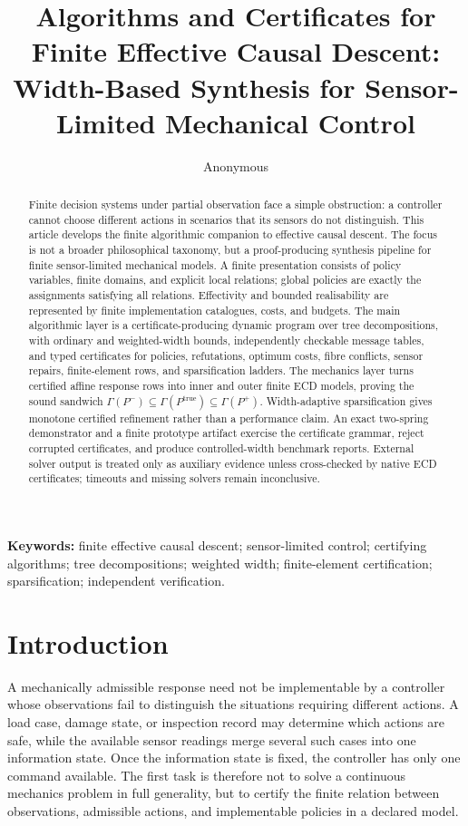 \documentclass[11pt]{article}
\title{Algorithms and Certificates for Finite Effective Causal Descent:\\
Width-Based Synthesis for Sensor-Limited Mechanical Control}
\author{Anonymous}
\date{}
\theoremstyle{plain}
\theoremstyle{definition}
\theoremstyle{remark}
\begin{document}
\maketitle

\begin{abstract}
Finite decision systems under partial observation face a simple obstruction: a
controller cannot choose different actions in scenarios that its sensors do not
distinguish.  This article develops the finite algorithmic companion to
effective causal descent.  The focus is not a broader philosophical taxonomy,
but a proof-producing synthesis pipeline for finite sensor-limited mechanical
models.  A finite presentation consists of policy variables, finite domains, and
explicit local relations; global policies are exactly the assignments satisfying
all relations.  Effectivity and bounded realisability are represented by finite
implementation catalogues, costs, and budgets.  The main algorithmic layer is a
certificate-producing dynamic program over tree decompositions, with ordinary
and weighted-width bounds, independently checkable message tables, and typed
certificates for policies, refutations, optimum costs, fibre conflicts, sensor
repairs, finite-element rows, and sparsification ladders.  The mechanics layer
turns certified affine response rows into inner and outer finite ECD models,
proving the sound sandwich
\(\Gamma(P^-)\subseteq\Gamma(P^{\mathrm{true}})\subseteq\Gamma(P^+)\).
Width-adaptive sparsification gives monotone certified refinement rather than a
performance claim.  An exact two-spring demonstrator and a finite prototype
artifact exercise the certificate grammar, reject corrupted certificates, and
produce controlled-width benchmark reports.  External solver output is treated
only as auxiliary evidence unless cross-checked by native ECD certificates;
timeouts and missing solvers remain inconclusive.
\end{abstract}

\noindent\textbf{Keywords:} finite effective causal descent; sensor-limited control;
certifying algorithms; tree decompositions; weighted width; finite-element
certification; sparsification; independent verification.

\tableofcontents

\section{Introduction}
\label{sec:introduction}

A mechanically admissible response need not be implementable by a controller
whose observations fail to distinguish the situations requiring different
actions.  A load case, damage state, or inspection record may determine which
actions are safe, while the available sensor readings merge several such cases
into one information state.  Once the information state is fixed, the controller
has only one command available.  The first task is therefore not to solve a
continuous mechanics problem in full generality, but to certify the finite
relation between observations, admissible actions, and implementable policies in
a declared model.
\end{document}
